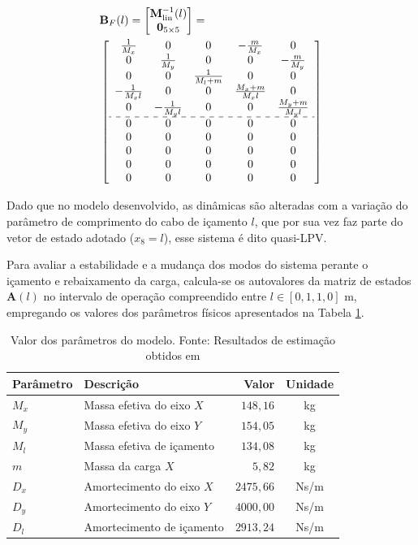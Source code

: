 \documentclass{ppgeesa}
\begin{document}
\begin{align}
&\mathbf{B}_F(l) = \begin{bmatrix} \mathbf{M}_{\text{lin}}^{-1}(l) \\ \mathbf{0}_{5\times5} \end{bmatrix} = \nonumber\\
&\left[\begin{array}{ccccc}
\frac{1}{M_x} & 0 & 0 & -\frac{m}{M_x} & 0 \\
0 & \frac{1}{M_y} & 0 & 0 & -\frac{m}{M_y} \\
0 & 0 & \frac{1}{M_l + m} & 0 & 0 \\
-\frac{1}{M_x l} & 0 & 0 & \frac{M_x + m}{M_x l} & 0 \\
0 & -\frac{1}{M_y l} & 0 & 0 & \frac{M_y + m}{M_y l} \\
\hdashline
0 & 0 & 0 & 0 & 0 \\
0 & 0 & 0 & 0 & 0 \\
0 & 0 & 0 & 0 & 0 \\
0 & 0 & 0 & 0 & 0 \\
0 & 0 & 0 & 0 & 0
\end{array}\right]
\end{align}

Dado que no modelo desenvolvido, as dinâmicas são alteradas com a variação do parâmetro de comprimento do cabo de içamento $l$, que por sua vez faz parte do vetor de estado adotado ($x_8 = l$), esse sistema é dito quasi-LPV. 

Para avaliar a estabilidade e a mudança dos modos do sistema perante o içamento e rebaixamento da carga, calcula-se os autovalores da matriz de estados $\mathbf{A}(l)$ no intervalo de operação compreendido entre $l \in [0{,}1, 1{,}0]$ \si{m}, empregando os valores dos parâmetros físicos apresentados na Tabela \ref{tab:and_xor_distributive}.

\begin{table}[H]
  \begin{center}
    \begin{tabular}{llrc}
      \hline
      \textbf{Parâmetro} & \textbf{Descrição} & \textbf{Valor} & \textbf{Unidade}\\
      \hline
      $M_x$ & Massa efetiva do eixo $X$ & $148,16$ & \si{kg}\\
      $M_y$ & Massa efetiva do eixo $Y$ & $154,05$ & \si{kg}\\
      $M_l$ & Massa efetiva de içamento & $134,08$ & \si{kg}\\
      $m$ & Massa da carga $X$ & $5,82$ & \si{kg}\\
      \hline
      $D_x$ & Amortecimento do eixo $X$ & $2475,66$ & \si{Ns/m}\\
      $D_y$ & Amortecimento do eixo $Y$ & $4000,00$ & \si{Ns/m}\\
      $D_l$ & Amortecimento de içamento & $2913,24$ & \si{Ns/m}\\
      \hline
    \end{tabular}
  \end{center}
  \caption{Valor dos parâmetros do modelo. Fonte: Resultados de estimação obtidos em \cite{thiago2026}}
  \label{tab:and_xor_distributive}
\end{table}
\end{document}
